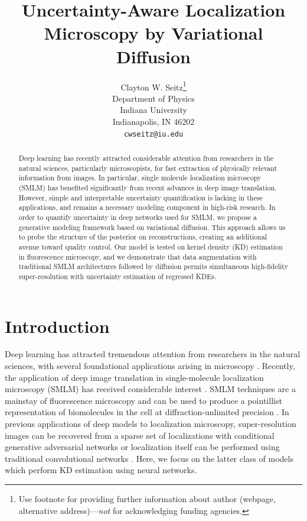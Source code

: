 \documentclass{article}
\title{Uncertainty-Aware Localization Microscopy by Variational Diffusion}
\author{%
  Clayton W. Seitz\thanks{Use footnote for providing further information
    about author (webpage, alternative address)---\emph{not} for acknowledging
    funding agencies.} \\
  Department of Physics\\
  Indiana University\\
  Indianapolis, IN 46202 \\
  \texttt{cwseitz@iu.edu} \\
}
\begin{document}
\maketitle


\begin{abstract}

Deep learning has recently attracted considerable attention from researchers in the natural sciences, particularly microscopists, for fast extraction of physically relevant information from images. In particular, single molecule localization microscopy (SMLM) has benefited significantly from recent advances in deep image translation. However, simple and interpretable uncertainty quantification is lacking in these applications, and remains a necessary modeling component in high-risk research. In order to quantify uncertainty in deep networks used for SMLM, we propose a generative modeling framework based on variational diffusion. This approach allows us to probe the structure of the posterior on reconstructions, creating an additional avenue toward quality control. Our model is tested on kernel density (KD) estimation in fluorescence microscopy, and we demonstrate that data augmentation with traditional SMLM architectures followed by diffusion permits simultaneous high-fidelity super-resolution with uncertainty estimation of regressed KDEs. 
\end{abstract}

\section{Introduction}

Deep learning has attracted tremendous attention from researchers in the natural sciences, with several foundational applications arising in microscopy \citep{Weigert2018,Falk2019}. Recently, the application of deep image translation in single-molecule localization microscopy (SMLM) has received considerable interest \citep{Ouyang2018,Nehme2020,Speiser2021}. SMLM techniques are a mainstay of fluorescence microscopy and can be used to produce a pointillist representation of biomolecules in the cell at diffraction-unlimited precision \citep{Rust2006,Betzig2006}. In previous applications of deep models to localization microscopy, super-resolution images can be recovered from a sparse set of localizations with conditional generative adversarial networks \citep{Ouyang2018} or localization itself can be performed using traditional convolutional networks \citep{Nehme2020,Speiser2021}. Here, we focus on the latter class of models which perform KD estimation using neural networks. 
\end{document}
